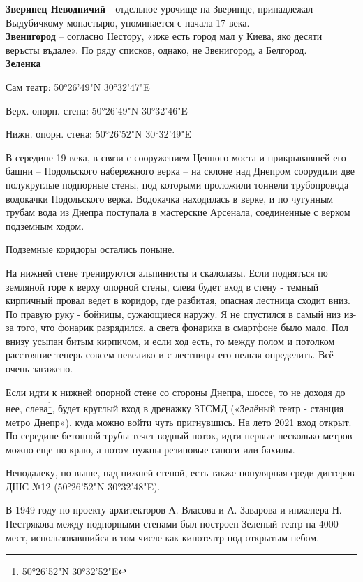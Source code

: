 \textbf{Зверинец Неводничий} - отдельное урочище на Зверинце, принадлежал Выдубичкому монастырю, упоминается с начала 17 века.\\

\textbf{Звенигород} – согласно Нестору, «иже есть город мал у Киева, яко десяти веръсты въдале». По ряду списков, однако, не Звенигород, а Белгород.\\

\textbf{Зеленка}

Сам театр: 50°26'49"N 30°32'47"E

Верх. опорн. стена: 50°26'49"N 30°32'46"E

Нижн. опорн. стена: 50°26'52"N 30°32'49"E

В середине 19 века, в связи с сооружением Цепного моста и прикрывавшей его башни – Подольского набережного верка – на склоне над Днепром соорудили две полукруглые подпорные стены, под которыми проложили тоннели трубопровода водокачки Подольского верка. Водокачка находилась в верке, и по чугунным трубам вода из Днепра поступала в мастерские Арсенала, соединенные с верком подземным ходом. 

Подземные коридоры остались поныне. 

На нижней стене тренируются альпинисты и скалолазы. Если подняться по земляной горе к верху опорной стены, слева будет вход в стену - темный кирпичный провал ведет в коридор, где разбитая, опасная лестница сходит вниз. По правую руку - бойницы, сужающиеся наружу. Я не спустился в самый низ из-за того, что фонарик разрядился, а света фонарика в смартфоне было мало. Пол внизу усыпан битым кирпичом, и если ход есть, то между полом и потолком расстояние теперь совсем невелико и с лестницы его нельзя определить. Всё очень загажено. 

Если идти к нижней опорной стене со стороны Днепра, шоссе, то не доходя до нее, слева\footnote{ 50°26'52"N 30°32'52"E}, будет круглый вход в дренажку ЗТСМД («Зелёный театр - станция метро Днепр»), куда можно войти чуть пригнувшись. На лето 2021 вход открыт. По середине бетонной трубы течет водный поток, идти первые несколько метров можно еще по краю, а потом нужны резиновые сапоги или бахилы.

Неподалеку, но выше, над нижней стеной, есть также популярная среди диггеров ДШС №12 (50°26'52"N 30°32'48"E).

В 1949 году по проекту архитекторов А. Власова и А. Заварова и инженера Н. Пестрякова между подпорными стенами был построен Зеленый театр на 4000 мест, использовавшийся в том числе как кинотеатр под открытым небом.

